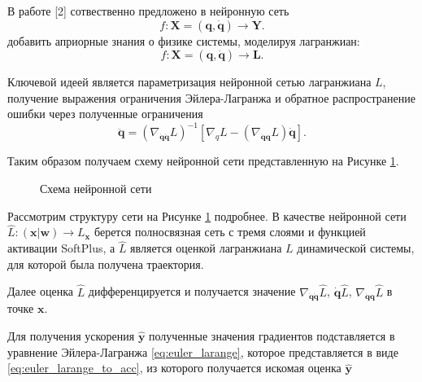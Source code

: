 \documentclass[12pt, twoside]{article}
\begin{document}
В работе [2] сотвественно предложено в нейронную сеть 
\begin{equation}
f: \mathbf{X} = (\mathbf{q}, \mathbf{\dot{q}}) \rightarrow \mathbf{Y}.
\end{equation}
 добавить априорные знания о физике системы, моделируя лагранжиан:
\begin{equation}
f: \mathbf{X} = (\mathbf{q}, \mathbf{\dot{q}}) \rightarrow \mathbf{L}.
\end{equation}

Ключевой идеей является параметризация нейронной сетью лагранжиана $L$, получение выражения ограничения Эйлера-Лагранжа и обратное распространение ошибки через полученные ограничения
\begin{equation}
\ddot{\mathbf{q}} =\left(\nabla_{\dot{\mathbf{q}} \dot{\mathbf{q}}} L\right)^{-1}\left[\nabla_{q} L-\left(\nabla_{\dot{\mathbf{q}}\mathbf{q}} L\right) \dot{\mathbf{q}}\right].
\label{eq:euler_larange_to_acc}
\end{equation}

Таким образом получаем схему нейронной сети представленную на Рисунке \ref{fig: LNN}. 

\begin{figure}[H]
\centerline{
}
\caption{Схема нейронной сети}
\label{fig: LNN}
\end{figure}

Рассмотрим структуру сети на Рисунке \ref{fig: LNN} подробнее.
В качестве нейронной сети $\hat{L} \colon (\mathbf{x} | \mathbf{w}) \to L_\mathbf{x}$ берется полносвязная сеть с тремя слоями и функцией активации SoftPlus, а $\hat{L}$ является оценкой лагранжиана $L$ динамической системы, для которой была получена траектория. 

Далее оценка $\hat{L}$ дифференцируется и получается значение $\nabla_{\dot{\mathbf{q}} \dot{\mathbf{q}}} \hat{L}$, $\dot{\mathbf{q}} \hat{L}$, $\nabla_{\dot{\mathbf{q}}\mathbf{q}} \hat{L}$ в точке $\mathbf{x}$.

Для получения ускорения $\hat{\mathbf{y}}$ полученные значения градиентов подставляется в уравнение Эйлера-Лагранжа \eqref{eq:euler_larange}, которое представляется в виде \eqref{eq:euler_larange_to_acc}, из которого получается искомая оценка $\hat{\mathbf{y}}$
\end{document}
